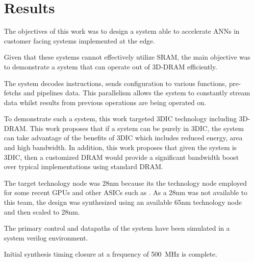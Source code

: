 \documentclass[journal]{IEEEtran}
\begin{document}
\section{Results}
\label{sec:Results}
The objectives of this work was to design a system able to accelerate ANNs in customer facing systems implemented at the edge. 

Given that these systems cannot effectively utilize SRAM, the main objective was to demonstrate a system that can operate out of 3D-DRAM efficiently.

The system decodes instructions, sends configuration to various functions, pre-fetchs and pipelines data.
This parallelism allows the system to constantly stream data whilst results from previous operations are being operated on.

To demonstrate such a system, this work targeted 3DIC technology including 3D-DRAM. This work proposes that if a system can be purely in 3DIC, the system can take advantage of the benefits
of 3DIC which includes reduced energy, area and high bandwidth.
In addition, this work proposes that given the system is 3DIC, then a customized DRAM would provide a significant bandwidth boost over typical implementations using standard DRAM.

The target technology node was 28nm because its the technology node employed for some recent GPUs and other ASICs such as \cite{jouppi2017datacenter}.
As a 28nm was not available to this team, the design was synthesized using an available 65nm technology node and then scaled to 28nm.

The primary control and datapaths of the system have been simulated in a system verilog environment. 

Initial synthesis timing closure at a frequency of \SI{500}{\mega\hertz} is complete.

\end{document}

